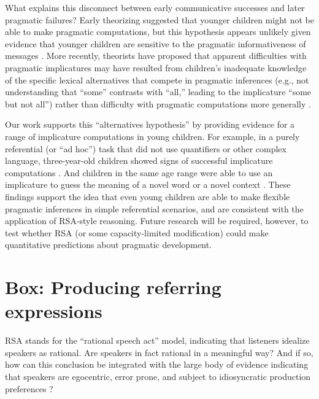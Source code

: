 \documentclass[]{elsarticle}
\begin{document}
What explains this disconnect between early communicative successes and
later pragmatic failures? Early theorizing suggested that younger
children might not be able to make pragmatic computations, but this hypothesis appears unlikely given evidence that
younger children are sensitive to the pragmatic informativeness of
messages \citep{katsos2011,oneill2001}. More
recently, theorists have proposed that apparent difficulties with
pragmatic implicatures may have resulted from children's inadequate
knowledge of the specific lexical alternatives that compete in pragmatic
inferences (e.g., not understanding that ``some'' contrasts with
``all,'' leading to the implicature ``some but not all'') rather than
difficulty with pragmatic computations more generally \citep{barner2011}.

Our work supports this ``alternatives hypothesis'' by providing evidence
for a range of implicature computations in young children. For example,
in a purely referential (or ``ad hoc'') task that did not use
quantifiers or other complex language, three-year-old children showed
signs of successful implicature computations \citep{stiller2015}. And children in the same age range were able to use an
implicature to guess the meaning of a novel word \citep{frank2014} or a novel context \citep{horowitz2016}. These findings support the idea that even young children are able
to make flexible pragmatic inferences in simple referential scenarios,
and are consistent with the application of RSA-style reasoning. Future
research will be required, however, to test whether RSA (or some
capacity-limited modification) could make quantitative predictions about
pragmatic development.

\section{Box: Producing referring expressions}\label{box-producing-referring-expressions}

RSA stands for the ``rational speech act'' model, indicating that listeners idealize speakers as rational.
Are speakers in fact rational in a meaningful way? And if so, how can this conclusion be
integrated with the large body of evidence indicating that speakers are
egocentric, error prone, and subject to idiosyncratic production
preferences \citep{keysar2003,lane2006,gatt2013}?
\end{document}

